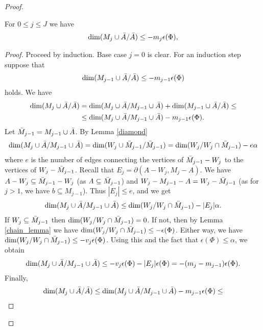 \begin{proof}
  \begin{Lemma} \label{ubdim_lemma}
    For $0 \leq j \leq J$ we have
    \begin{align*}
      \dim(M_j \cup \bar A / \bar A) \leq -m_j  \epsilon(\Phi),
    \end{align*}
  \end{Lemma}
  \begin{proof}
    Proceed by induction. Base case $j = 0$ is clear.    
    For an induction step suppose that
    \begin{align*}
      \dim(M_{j-1} \cup \bar A / \bar A) \leq  - m_{j-1}  \epsilon(\Phi)
    \end{align*}
    holds.
    We have
    \begin{align*}
      \dim(M_j \cup \bar A / \bar A) &= \dim(M_j \cup \bar A / M_{j-1} \cup \bar A) + \dim(M_{j-1} \cup \bar A / \bar A) \leq \\
      &\leq \dim(M_j \cup \bar A / M_{j-1} \cup \bar A) - m_{j-1}  \epsilon(\Phi).
    \end{align*}
    Let $\bar M_{j-1} = M_{j-1} \cup \bar A$.
    By Lemma \ref{diamond}
    \begin{align*}
      \dim(M_j \cup \bar A / M_{j-1} \cup \bar A) = \dim(W_j \cup \bar M_{j-1} / \bar M_{j-1}) = \dim(W_j / W_j \cap \bar M_{j-1}) - e \alpha
    \end{align*}
    where $e$ is the number of edges connecting the vertices of $\bar M_{j-1} - W_j$ to the vertices of $W_j - \bar M_{j-1}$.
    Recall that       $E_j = \partial(A - W_j, M_j - A)$.
    We have $A - W_j \subseteq \bar M_{j-1} - W_j$ (as $A \subseteq \bar M_{j-1}$) and $W_j - M_{j-1} - A = W_j - \bar M_{j-1}$ (as for $j > 1$, we have $b \subseteq M_{j-1}$).
    Thus $|E_j| \leq e$, and we get 
    \begin{align*}
      \dim(M_j \cup \bar A / M_{j-1} \cup \bar A) \leq \dim(W_j / W_j \cap \bar M_{j-1}) - |E_j| \alpha.
    \end{align*}
    If $W_j \subseteq \bar M_{j-1}$ then $\dim(W_j / W_j \cap \bar M_{j-1}) = 0$.
    If not, then by Lemma \ref{chain_lemma} we have $\dim(W_j / W_j \cap \bar M_{j-1}) \leq - \epsilon(\Phi)$.
    Either way, we have $\dim(W_j / W_j \cap \bar M_{j-1}) \leq - v_j \epsilon(\Phi)$.
    Using this and the fact that $\epsilon(\Phi) \leq \alpha$, we obtain
    \begin{align*}
      \dim(M_j \cup \bar A / M_{j-1} \cup \bar A) \leq - v_j \epsilon(\Phi) - |E_j| \epsilon(\Phi) = -(m_j - m_{j-1})\epsilon(\Phi).
    \end{align*}
    Finally,
    \begin{align*}
      \dim(M_j \cup \BA / \BA) &\leq \dim(M_j \cup \BA / M_{j-1} \cup \BA) - m_{j-1}  \epsilon(\Phi) \leq \\

\end{align*}
\end{proof}
\end{proof}
